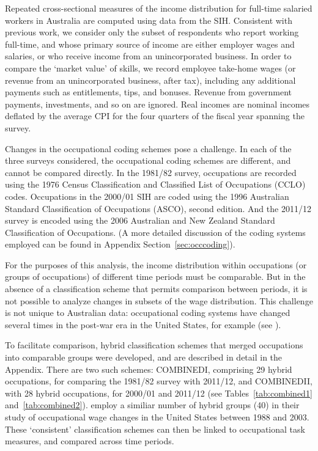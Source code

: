 Repeated cross-sectional measures of the income distribution for full-time salaried workers in Australia are computed using data from the SIH. Consistent with previous work, we consider only the subset of respondents who report working full-time, and whose primary source of income are either employer wages and salaries, or who receive income from an unincorporated business. In order to compare the `market value' of skills, we record employee take-home wages (or revenue from an unincorporated business, after tax), including any additional payments such as entitlements, tips, and bonuses. Revenue from government payments, investments, and so on are ignored. Real incomes are nominal incomes deflated by the average CPI for the four quarters of the fiscal year spanning the survey.

Changes in the occupational coding schemes pose a challenge. In each of the three surveys considered, the occupational coding schemes are different, and cannot be compared directly. In the 1981/82 survey, occupations are recorded using the 1976 Census Classification and Classified List of Occupations (CCLO) codes. Occupations in the 2000/01 SIH are coded using the 1996 Australian Standard Classification of Occupations (ASCO), second edition. And the 2011/12 survey is encoded using the 2006 Australian and New Zealand Standard Classification of Occupations. (A more detailed discussion of the coding systems employed can be found in Appendix Section~\ref{sec:occcoding}). 

For the purposes of this analysis, the income distribution within occupations (or groups of occupations) of different time periods must be comparable. But in the absence of a classification scheme that permits comparison between periods, it is not possible to analyze changes in subsets of the wage distribution. This challenge is not unique to Australian data: occupational coding systems have changed several times in the post-war era in the United States, for example (see \cite{Autor2012,Meyer2005}).

To facilitate comparison, hybrid classification schemes that merged occupations into comparable groups were developed, and are described in detail in the Appendix. There are two such schemes: COMBINEDI, comprising 29 hybrid occupations, for comparing the 1981/82 survey with 2011/12, and COMBINEDII, with 28 hybrid occupations, for 2000/01 and 2011/12 (see Tables~\ref{tab:combined1} and~\ref{tab:combined2}). \citet{Firpo2011} employ a similiar number of hybrid groups (40) in their study of occupational wage changes in the United States between 1988 and 2003. These `consistent' classification schemes can then be linked to occupational task measures, and compared across time periods.

